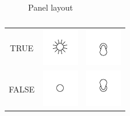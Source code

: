 \documentclass[a4paper]{report}
\author{hephaisto}
\title{\moduleTitle}
\begin{document}

\begin{figure}[t]
	\begin{center}
		\begin{tikzpicture}[scale=0.03,y=-1cm]
			
		\end{tikzpicture}
	\end{center}
	\caption{Panel layout}
	\label{fig:b_layout}
\end{figure}

\begin{table}
	\centering
	\begin{tabular}{|cm{1cm}m{1cm}|}\hline
		TRUE & \includegraphics{../common/cliparts/led_on} & \includegraphics{../common/cliparts/switch_down} \\
		FALSE & \includegraphics{../common/cliparts/led_off} & \includegraphics{../common/cliparts/switch_up} \\\hline
	\end{tabular}
	\caption{
	}
	\label{tab:b_io_logic}
\end{table}



\end{document}
